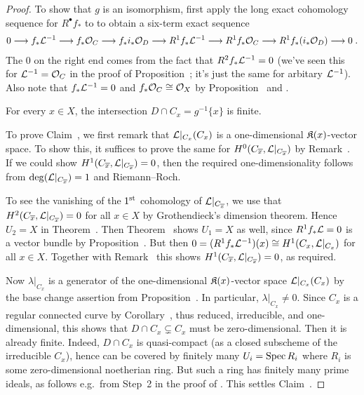 \documentclass[a4paper,parskip=half,numbers=enddot, DIV=12]{scrreprt}
\begin{document}
\begin{proof}
	To show that $g$ is an isomorphism, first apply the long exact cohomology sequence for $R^\bullet f_*$ to  to obtain a six-term exact sequence
	\begin{align}\lbl{eq:sixtermRpSequence}
		0\morphism f_*\Ll^{-1}\morphism f_*\Oo_C\morphism f_*i_*\Oo_D\morphism R^1f_*\Ll^{-1}\morphism R^1f_*\Oo_C\morphism R^1f_*(i_*\Oo_D)\morphism 0\;.
	\end{align}
	The $0$ on the right end comes from the fact that $R^2f_*\mathcal{L}^{-1}=0$ (we've seen this for $\mathcal{L}^{-1}=\mathcal{O}_C$ in the proof of Proposition~; it's just the same for arbitary $\mathcal{L}^{-1}$). Also note that $f_*\mathcal{L}^{-1}=0$ and $f_*\mathcal{O}_C\cong\mathcal{O}_X$ by Proposition~ and .
	\begin{claim}
		For every $x\in X$, the intersection $D\cap C_x=g^{-1}\{x\}$ is finite.
	\end{claim}
	To prove Claim~, we first remark that $\mathcal{L}|_{C_x}(C_x)$ is a one-dimensional $\mathfrak{K}(x)$-vector space. To show this, it suffices to prove the same for $H^0(C_{\overline{x}},\mathcal{L}|_{C_{\overline{x}}})$ by Remark~. If we could show $H^1(C_{\overline{x}},\mathcal{L}|_{C_{\overline{x}}})=0$, then the required one-dimensionality follows from $\deg(\mathcal{L}|_{C_{\overline{x}}})=1$ and Riemann--Roch. 
	
	To see the vanishing of the $1^{\text{st}}$ cohomology of $\mathcal{L}|_{C_{\overline{x}}}$, we use that $H^2(C_{\overline{x}},\mathcal{L}|_{C_{\overline{x}}})=0$ for all $x\in X$ by Grothendieck's dimension theorem. Hence $U_2=X$ in Theorem~. Then Theorem~ shows $U_1=X$ as well, since $R^1f_*\mathcal{L}=0$ is a vector bundle by Proposition~. But then $0=(R^1f_*\mathcal{L}^{-1})(x)\cong H^1(C_x,\mathcal{L}|_{C_x})$ for all $x\in X$. Together with Remark~ this shows $H^1(C_{\overline{x}},\mathcal{L}|_{C_{\overline{x}}})=0$, as required.
	
	Now $\lambda|_{C_x}$ is a generator of the one-dimensional $\mathfrak{K}(x)$-vector space $\mathcal{L}|_{C_x}(C_x)$ by the base change assertion from Proposition~. In particular, $\lambda|_{C_x}\neq 0$. Since $C_x$ is a regular connected curve by Corollary~, thus reduced, irreducible, and one-dimensional, this shows that $D\cap C_x\subsetneq C_x$ must be zero-dimensional. Then it is already finite. Indeed, $D\cap C_x$ is quasi-compact (as a closed subscheme of the irreducible $C_x$), hence can be covered by finitely many $U_i=\operatorname{Spec} R_i$ where $R_i$ is some zero-dimensional noetherian ring. But such a ring has finitely many prime ideals, as follows e.g.\ from Step~2 in the proof of \cite[Proposition~3.1.1]{alg2}. This settles Claim~.
	

\end{proof}
\end{document}
